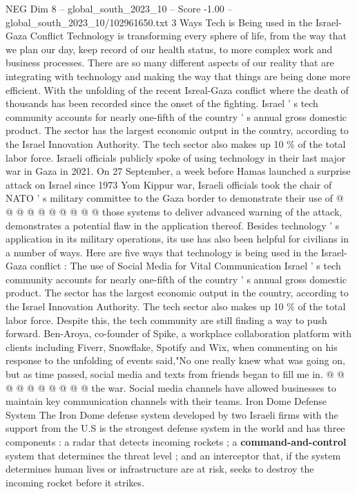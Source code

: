 \begin{textsample}{NEG Dim 8 – global\_south\_2023\_10 – Score -1.00 – global\_south\_2023\_10/102961650.txt}  \label{ex:f8_neg_092}
3 Ways Tech is Being used in the Israel-Gaza Conflict Technology is transforming every sphere of life, from the way that we plan our day, keep record of our health status, to more complex work and business processes.
There are so many different aspects of our reality that are integrating with technology and making the way that things are being done more efficient.
With the unfolding of the recent Isreal-Gaza conflict where the death of thousands has been recorded since the onset of the fighting.
Israel ' s tech community accounts for nearly one-fifth of the country ' s annual gross domestic product.
The sector has the largest economic output in the country, according to the Israel Innovation Authority.
The tech sector also makes up 10 \% of the total labor force.
Israeli officials publicly spoke of using technology in their last major war in Gaza in 2021.
On 27 September, a week before Hamas launched a surprise attack on Israel since 1973 Yom Kippur war, Israeli officials took the chair of NATO ' s military committee to the Gaza border to demonstrate their use of @ @ @ @ @ @ @ @ @ @ those systems to deliver advanced warning of the attack, demonstrates a potential flaw in the application thereof.
Besides technology ' s application in its military operations, its use has also been helpful for civilians in a number of ways.
Here are five ways that technology is being used in the Israel-Gaza conflict : The use of Social Media for Vital Communication Israel ' s tech community accounts for nearly one-fifth of the country ' s annual gross domestic product.
The sector has the largest economic output in the country, according to the Israel Innovation Authority.
The tech sector also makes up 10 \% of the total labor force.
Despite this, the tech community are still finding a way to push forward.
Ben-Aroya, co-founder of Spike, a workplace collaboration platform with clients including Fiverr, Snowflake, Spotify and Wix, when commenting on his response to the unfolding of events said,"No one really knew what was going on, but as time passed, social media and texts from friends began to fill me in. @ @ @ @ @ @ @ @ @ @ the war.
Social media channels have allowed businesses to maintain key communication channels with their teams.
Iron Dome Defense System The Iron Dome defense system developed by two Israeli firms with the support from the U.S is the strongest defense system in the world and has three components : a radar that detects incoming rockets ; a \textbf{command-and-control} system that determines the threat level ; and an interceptor that, if the system determines human lives or infrastructure are at risk, seeks to destroy the incoming rocket before it strikes.

\end{textsample}

